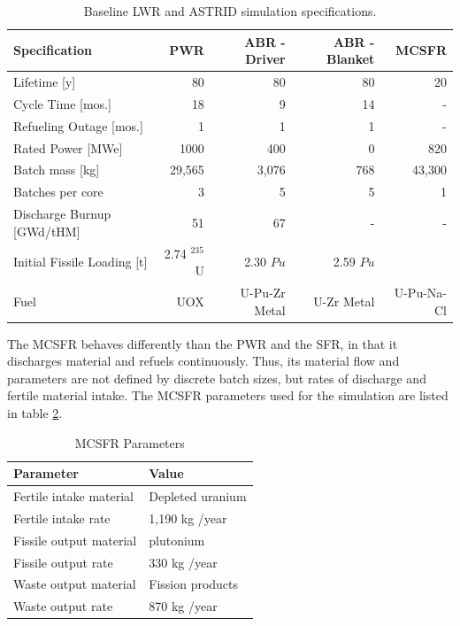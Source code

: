 \begin{table}[h]
    \centering
    \caption{Baseline \gls{LWR} and \gls{ASTRID} simulation specifications.}
    \begin{tabular}{lrrrr}
        \hline
        \textbf{Specification} & \textbf{\gls{PWR} \cite{sutharshan_ap1000tm_2011}} & \textbf{\gls{ABR} - Driver \cite{kim_core_2009}} & \textbf{\gls{ABR} - Blanket \cite{kim_core_2009}} & \textbf{\gls{MCSFR} \cite{smith_assessment_1974}}\\
        \hline
                Lifetime [y]  & 80 & 80 & 80 & 20 \\
                Cycle Time [mos.]& 18 & 9 & 14 & -\\ 
                Refueling Outage [mos.]& 1 & 1 & 1 & -\\
                Rated Power [\gls{MWe}] & 1000 & 400 & 0 & 820\\
                Batch mass [kg] & 29,565 & 3,076 & 768 & 43,300\\
                Batches per core & 3 & 5 & 5 & 1\\
                Discharge Burnup [GWd/tHM] & 51 & 67 & - & - \\
                Initial Fissile Loading [t] & 2.74  $^{235}$U & 2.30 $Pu$ & 2.59 $Pu$ \\
                Fuel & UOX & U-Pu-Zr Metal & U-Zr Metal & U-Pu-Na-Cl \\
        \hline
    \end{tabular}
        
    \label{tab:reactor}

    \end{table}

The \gls{MCSFR} behaves differently than the \gls{PWR} and the \gls{SFR}, in
that it discharges material and refuels continuously. Thus, its material flow
and parameters are not defined by discrete batch sizes, but rates of discharge
and fertile material intake. The \gls{MCSFR} parameters used for the simulation
are listed in table \ref{tab:msr}.

\begin{table}[h]
    \centering
    \caption{\gls{MCSFR} Parameters}
    \begin{tabular}{ll}
        \hline
        Parameter & Value \\
        \hline
        Fertile intake material & Depleted uranium \\
        Fertile intake rate & 1,190 kg /year\\ 
        Fissile output material & plutonium \\
        Fissile output rate & 330 kg /year \\
        Waste output material & Fission products \\
        Waste output rate & 870 kg /year \\
        \hline
    \end{tabular}
    \label{tab:msr}
\end{table}



